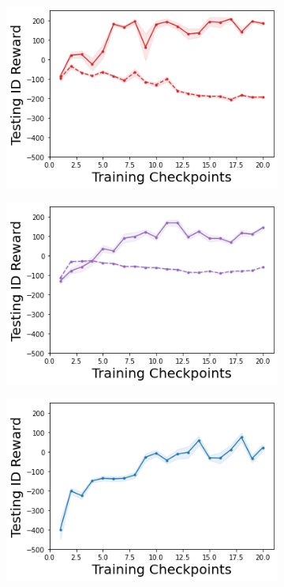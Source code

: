 \begin{figure}
    \begin{subfigure}{.24\textwidth}
        \includegraphics[width=\textwidth]{sections/011_icml2022/resources/DropOut-LunarLander-v2-mean_reward_-testing-strategy.png}
    \end{subfigure}
    \begin{subfigure}{.24\textwidth}
        \includegraphics[width=\textwidth]{sections/011_icml2022/resources/Ensemble-LunarLander-v2-mean_reward_-testing-strategy.png}
    \end{subfigure}
    \begin{subfigure}{.24\textwidth}
        \includegraphics[width=\textwidth]{sections/011_icml2022/resources/DKL-LunarLander-v2-mean_reward_-testing-strategy.png}

\end{subfigure}
\end{figure}
